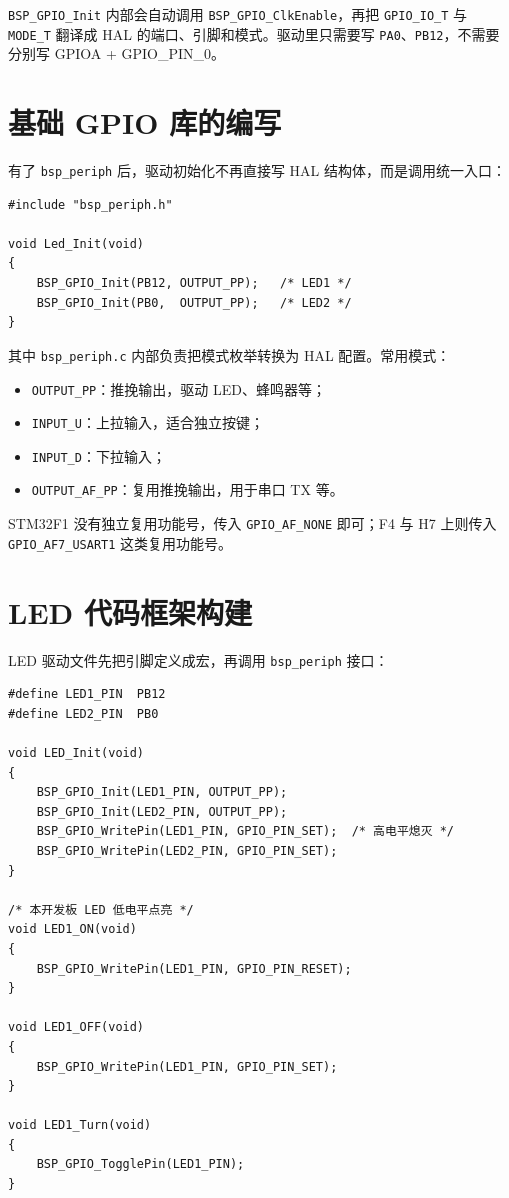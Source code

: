 \texttt{BSP\_GPIO\_Init} 内部会自动调用 \texttt{BSP\_GPIO\_ClkEnable}，再把 \texttt{GPIO\_IO\_T} 与 \texttt{MODE\_T} 翻译成 HAL 的端口、引脚和模式。驱动里只需要写 \texttt{PA0}、\texttt{PB12}，不需要分别写 GPIOA + GPIO\_PIN\_0。

\section{基础 GPIO 库的编写}

有了 \texttt{bsp\_periph} 后，驱动初始化不再直接写 HAL 结构体，而是调用统一入口：

\begin{lstlisting}[style=c]
#include "bsp_periph.h"

void Led_Init(void)
{
    BSP_GPIO_Init(PB12, OUTPUT_PP);   /* LED1 */
    BSP_GPIO_Init(PB0,  OUTPUT_PP);   /* LED2 */
}
\end{lstlisting}

其中 \texttt{bsp\_periph.c} 内部负责把模式枚举转换为 HAL 配置。常用模式：

\begin{itemize}
\item \texttt{OUTPUT\_PP}：推挽输出，驱动 LED、蜂鸣器等；
\item \texttt{INPUT\_U}：上拉输入，适合独立按键；
\item \texttt{INPUT\_D}：下拉输入；
\item \texttt{OUTPUT\_AF\_PP}：复用推挽输出，用于串口 TX 等。
\end{itemize}

STM32F1 没有独立复用功能号，传入 \texttt{GPIO\_AF\_NONE} 即可；F4 与 H7 上则传入 \texttt{GPIO\_AF7\_USART1} 这类复用功能号。

\section{LED 代码框架构建}

LED 驱动文件先把引脚定义成宏，再调用 \texttt{bsp\_periph} 接口：

\begin{lstlisting}[style=c]
#define LED1_PIN  PB12
#define LED2_PIN  PB0

void LED_Init(void)
{
    BSP_GPIO_Init(LED1_PIN, OUTPUT_PP);
    BSP_GPIO_Init(LED2_PIN, OUTPUT_PP);
    BSP_GPIO_WritePin(LED1_PIN, GPIO_PIN_SET);  /* 高电平熄灭 */
    BSP_GPIO_WritePin(LED2_PIN, GPIO_PIN_SET);
}

/* 本开发板 LED 低电平点亮 */
void LED1_ON(void)
{
    BSP_GPIO_WritePin(LED1_PIN, GPIO_PIN_RESET);
}

void LED1_OFF(void)
{
    BSP_GPIO_WritePin(LED1_PIN, GPIO_PIN_SET);
}

void LED1_Turn(void)
{
    BSP_GPIO_TogglePin(LED1_PIN);
}
\end{lstlisting}

